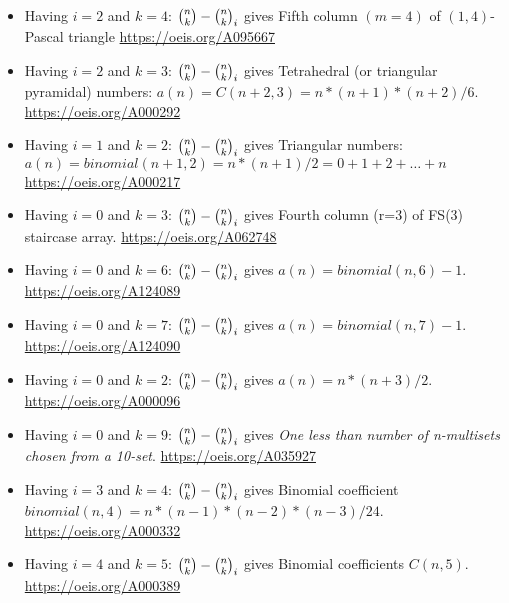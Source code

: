 \begin{itemize}
    \item Having $i=2$ and $k=4$: $\binom{n}{k} - \binom{n}{k}_{i}$ gives
    Fifth column $(m=4)$ of $(1,4)$-Pascal triangle \url{https://oeis.org/A095667}
    \item Having $i=2$ and $k=3$: $\binom{n}{k} - \binom{n}{k}_{i}$ gives
    Tetrahedral (or triangular pyramidal) numbers: $a(n) = C(n+2,3) = n*(n+1)*(n+2)/6$.
    \url{https://oeis.org/A000292}
    \item Having $i=1$ and $k=2$: $\binom{n}{k} - \binom{n}{k}_{i}$ gives
    Triangular numbers: $a(n) = binomial(n+1,2) = n*(n+1)/2 = 0 + 1 + 2 + \dots + n$
    \url{https://oeis.org/A000217}
    \item Having $i=0$ and $k=3$: $\binom{n}{k} - \binom{n}{k}_{i}$ gives
    Fourth column (r=3) of FS(3) staircase array.
    \url{https://oeis.org/A062748}
    \item Having $i=0$ and $k=6$: $\binom{n}{k} - \binom{n}{k}_{i}$ gives
    $a(n) = binomial(n,6)-1$.
    \url{https://oeis.org/A124089}
    \item Having $i=0$ and $k=7$: $\binom{n}{k} - \binom{n}{k}_{i}$ gives
    $a(n) = binomial(n,7)-1$.
    \url{https://oeis.org/A124090}
    \item Having $i=0$ and $k=2$: $\binom{n}{k} - \binom{n}{k}_{i}$ gives
    $a(n) = n*(n+3)/2$.
    \url{https://oeis.org/A000096}
    \item Having $i=0$ and $k=9$: $\binom{n}{k} - \binom{n}{k}_{i}$ gives
    \textit{One less than number of n-multisets chosen from a 10-set}.
    \url{https://oeis.org/A035927}
    \item Having $i=3$ and $k=4$: $\binom{n}{k} - \binom{n}{k}_{i}$ gives
    Binomial coefficient $binomial(n,4) = n*(n-1)*(n-2)*(n-3)/24$.
    \url{https://oeis.org/A000332}
    \item Having $i=4$ and $k=5$: $\binom{n}{k} - \binom{n}{k}_{i}$ gives
    Binomial coefficients $C(n,5)$.
    \url{https://oeis.org/A000389}
\end{itemize}
